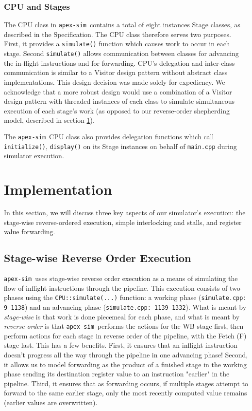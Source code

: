\documentclass[12pt]{article}
\newcommand{\codename}[0]{\texttt{apex-sim}~}
\begin{document}
\subsubsection{CPU and Stages}
The CPU class in \codename contains a total of eight instances Stage classes, as described in the Specification. The CPU class therefore serves two purposes. 
First, it provides a \texttt{simulate()} function which causes work to occur in each stage. 
Second \texttt{simulate()} allows communication between classes for advancing the in-flight instructions and for forwarding.  
CPU's delegation and inter-class communication is similar to a Visitor design pattern without abstract class implementations. 
This design decision was made solely for expediency. 
We acknowledge that a more robust design would use a combination of a Visitor design pattern with threaded instances of each class to simulate simultaneous execution of each stage's work (as opposed to our reverse-order shepherding model, described in section \ref{sec:implementation}).

The \codename CPU class also provides delegation functions which call \texttt{initialize()}, \texttt{display()} on its Stage instances on behalf of \texttt{main.cpp} during simulator execution.

\section{Implementation}
\label{sec:implementation}
In this section, we will discuss three key aspects of our simulator's execution: the stage-wise reverse-ordered execution, simple interlocking and stalls, and register value forwarding.

\subsection{Stage-wise Reverse Order Execution}
\codename uses stage-wise reverse order execution as a means of simulating the flow of inflight instructions through the pipeline. 
This execution consists of two phases using the \texttt{CPU::simulate(...)} function: a working phase (\texttt{simulate.cpp: 9-1138}) and an advancing phase (\texttt{simulate.cpp: 1139-1332}). 
What is meant by \textit{stage-wise} is that work is done piecemeal for each phase, and what is meant by \textit{reverse order} is that \codename performs the actions for the WB stage first, then perform actions for each stage in reverse order of the pipeline, with the Fetch (F) stage last. 
This has a few benefits. 
First, it ensures that an inflight instruction doesn't progress all the way through the pipeline in one advancing phase! 
Second, it allows us to model forwarding as the product of a finished stage in the working phase sending its destination register value to an instruction "earlier" in the pipeline. 
Third, it ensures that as forwarding occurs, if multiple stages attempt to forward to the same earlier stage, only the most recently computed value remains (earlier values are overwritten).
\end{document}
